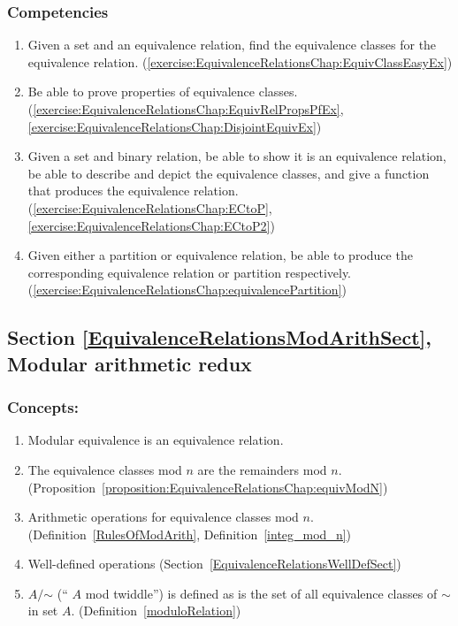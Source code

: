 \subsubsection*{Competencies}
\begin{enumerate}
\item
Given a set and an equivalence relation, find the equivalence classes for the equivalence relation.  (\ref{exercise:EquivalenceRelationsChap:EquivClassEasyEx})
\item
Be able to prove properties of equivalence classes. (\ref{exercise:EquivalenceRelationsChap:EquivRelPropsPfEx}, \ref{exercise:EquivalenceRelationsChap:DisjointEquivEx})
\item
Given a set and binary relation, be able to show it is an equivalence relation,  be able to describe and depict the equivalence classes, and give a function that produces the equivalence relation. (\ref{exercise:EquivalenceRelationsChap:ECtoP}, \ref{exercise:EquivalenceRelationsChap:ECtoP2})
\item
Given either a partition or equivalence relation, be able to produce the corresponding equivalence relation or partition respectively. (\ref{exercise:EquivalenceRelationsChap:equivalencePartition})
\end{enumerate}


\subsection*{Section \ref{EquivalenceRelationsModArithSect}, Modular arithmetic redux}
\subsubsection*{Concepts:}
\begin{enumerate}
\item 
Modular equivalence is an equivalence relation.
\item
The equivalence classes  mod $n$ are the remainders mod $n$.  (Proposition~\ref{proposition:EquivalenceRelationsChap:equivModN})
\item
Arithmetic operations for equivalence classes mod $n$. (Definition~\ref{RulesOfModArith}, Definition~\ref{integ_mod_n})
\item
Well-defined operations (Section~\ref{EquivalenceRelationsWellDefSect})
\item
$A/\mathord{\sim}$ (`` $A$ mod twiddle'') is defined as is the set of all equivalence classes of $\sim$ in set $A$.  (Definition~\ref{moduloRelation})
\end{enumerate}

